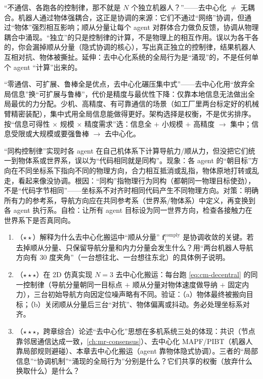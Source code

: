 \begin{pitfall}
“不通信、各跑各的控制律，那不就是 $N$ 个独立机器人？”——去中心化 $\ne$ 无耦合。机器人通过物体强耦合，这正是协调的来源：它们不通过“网络”协调，但通过“物体”强烈相互影响；顺从分量让每个 agent 对群体合力做负反馈，协调从物理耦合中涌现。“独立”的只是控制律的计算，不是物理上的相互作用。误以为各干各的，你会漏掉顺从分量（隐式协调的核心），写出真正独立的控制律，结果机器人互相对抗、物体被撕扯。延伸：去中心化系统的全局行为是“涌现”的，不是任何单个 agent “计算”出来的。
\end{pitfall}

\begin{pitfall}
“零通信、可扩展、鲁棒全是优点，去中心化碾压集中式”——去中心化用“放弃全局信息”换“可扩展与鲁棒”，代价是精度与最优性下降：仅靠本地信息无法做出全局最优的力分配。少机、高精度、有可靠通信的场景（如工厂里两台标定好的机械臂精密装配），集中式用全局信息能做得更好。架构选择是权衡，不是优劣排序。按“信息可得性 $\times$ 规模 $\times$ 精度需求”选：信息全 $+$ 小规模 $+$ 高精度 $\to$ 集中；信息受限或大规模或要强鲁棒 $\to$ 去中心化。
\end{pitfall}

\begin{pitfall}
“同构控制律”实现时各 agent 在自己机体系下计算导航力/顺从力，但没把它们统一到物体系或世界系，误以为“代码相同就是同构”。现象：各 agent 的“朝目标”方向在不同坐标系下指向不同的物理方向，合力相互抵消或乱指，物体原地打转或乱走，看起来像没协调。根因：“同构”指物理行为同构（都朝同一物理目标使劲），不是“代码字节相同”——坐标系不对齐时相同代码产生不同物理方向。对策：明确所有力的参考系，导航方向应在共同参考系（世界系/物体系）中定义，再变换到各 agent 执行系。自检：让所有 agent 目标设为同一世界方向，检查各接触力在世界系下是否真同向。
\end{pitfall}

\begin{practice}
\begin{enumerate}
  \item （$\star\star$）解释为什么去中心化搬运中“顺从分量” $\mathbf{f}_i^{\text{comply}}$ 是协调收敛的关键。若去掉顺从分量、只保留导航分量和内力分量会发生什么？用“两台机器人导航方向有 $30$ 度夹角”（一台想往北、一台想往东北）的具体例子说明。
  \item （$\star\star\star$）在 2D 仿真实现 $N=3$ 去中心化搬运：每台跑 \cref{eq:cm-decentral} 的同一控制律（导航分量朝同一目标点 $+$ 顺从分量对物体速度做导纳 $+$ 固定内力），三台初始导航方向因定位噪声略有不同。验证：（a）物体最终被搬向目标；（b）关闭顺从分量后三台“对抗”、物体偏离或抖动。务必处理坐标系对齐。
  \item （$\star\star\star$，跨章综合）论述“去中心化”思想在多机系统三处的体现：共识（节点靠邻居通信达成一致，\cref{ch:mr-consensus}）、去中心化 MAPF/PIBT（机器人靠局部规则避碰）、本章去中心化搬运（agent 靠物体隐式协调）。三者的“局部信息”“协调机制”“涌现的全局行为”分别是什么？它们共享的权衡（放弃什么换取什么）是什么？
\end{enumerate}
\end{practice}

